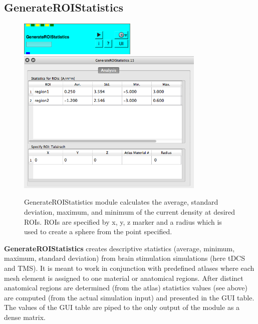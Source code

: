 \documentclass[fleqn,11pt,openany]{book}
\newcommand{\imgSm}{0.5}
\begin{document}
\subsection{GenerateROIStatistics}
\begin{figure}[H]
	\centering
	\includegraphics[width=\imgSm\textwidth]{BrainStimulation_figures/generateroistatistics.png}
	\includegraphics[width=0.8\textwidth]{BrainStimulation_figures/generateroistatistics_GUI.png}
	\caption{GenerateROIStatistics module calculates the average, standard deviation, maximum, and minimum of the current density at desired ROIs. ROIs are specified by x, y, z marker and a radius which is used to create a sphere from the point specified.}
	\label{fig:gen_roi_statistics}
\end{figure}

\textbf{GenerateROIStatistics} creates descriptive statistics (average, minimum, maximum, standard deviation) from brain stimulation simulations 
(here tDCS and TMS). It is meant to work in conjunction with predefined atlases where each mesh element is assigned to one material or anatomical
regions. After distinct anatomical regions are determined (from the atlas) statistics values (see above) are computed (from the actual simulation input) 
and presented in the GUI table. The values of the GUI table are piped to the only output of the module as a dense matrix. 
\end{document}
